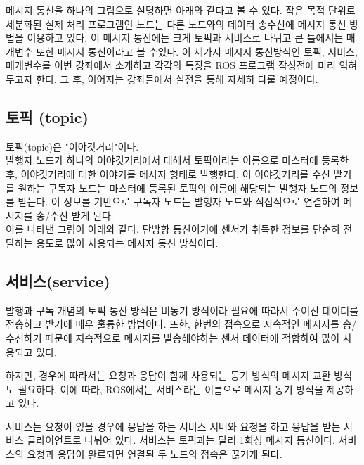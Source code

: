 메시지 통신을 하나의 그림으로 설명하면 아래와 같다고 볼 수 있다. 작은 목적 단위로 세분화된 실제 처리 프로그램인 노드는 다른 노드와의 데이터 송수신에 메시지 통신 방법을 이용하고 있다. 이 메시지 통신에는 크게 토픽과 서비스로 나뉘고 큰 틀에서는 매개변수 또한 메시지 통신이라고 볼 수있다. 이 세가지 메시지 통신방식인 토픽, 서비스, 매개변수를 이번 강좌에서 소개하고 각각의 특징을 ROS 프로그램 작성전에 미리 익혀두고자 한다. 그 후, 이어지는 강좌들에서 실전을 통해 자세히 다룰 예정이다.

\subsection{토픽 (topic)}

토픽(topic)은 "이야깃거리"이다.\\ 

발행자 노드가 하나의 이야깃거리에서 대해서 토픽이라는 이름으로 마스터에 등록한 후, 이야깃거리에 대한 이야기를 메시지 형태로 발행한다. 이 이야깃거리를 수신 받기를 원하는 구독자 노드는 마스터에 등록된 토픽의 이름에 해당되는 발행자 노드의 정보를 받는다. 이 정보를 기반으로 구독자 노드는 발행자 노드와 직접적으로 연결하여 메시지를 송/수신 받게 된다. \\

이를 나타낸 그림이 아래와 같다. 단방향 통신이기에 센서가 취득한 정보를 단순히 전달하는 용도로 많이 사용되는 메시지 통신 방식이다.

\subsection{서비스(service)}

발행과 구독 개념의 토픽 통신 방식은 비동기 방식이라 필요에 따라서 주어진 데이터를 전송하고 받기에 매우 훌륭한 방법이다. 또한, 한번의 접속으로 지속적인 메시지를 송/수신하기 때문에 지속적으로 메시지를 발송해야하는 센서 데이터에 적합하여 많이 사용되고 있다. 

하지만, 경우에 따라서는 요청과 응답이 함께 사용되는 동기 방식의 메시지 교환 방식도 필요하다. 이에 따라, ROS에서는 서비스라는 이름으로 메시지 동기 방식을 제공하고 있다. 

서비스는 요청이 있을 경우에 응답을 하는 서비스 서버와 요청을 하고 응답을 받는 서비스 클라이언트로 나뉘어 있다. 서비스는 토픽과는 달리 1회성 메시지 통신이다. 서비스의 요청과 응답이 완료되면 연결된 두 노드의 접속은 끊기게 된다. 

